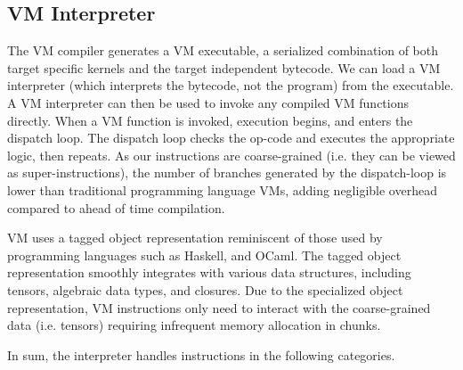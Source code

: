 \subsection{VM Interpreter}



The VM compiler generates a VM executable,
  a serialized combination of both target specific kernels
  and the target independent bytecode.
We can load a VM interpreter (which interprets the bytecode, not the program) from the executable.
A VM interpreter can then be used to invoke any compiled VM
  functions directly.
When a VM function is invoked,
  execution begins, and enters the dispatch loop.
The dispatch loop checks the op-code and executes
  the appropriate logic, then repeats.
As our instructions are coarse-grained (i.e. they can be viewed as super-instructions),
  the number of branches generated by the dispatch-loop is lower
  than traditional programming language VMs,
  adding negligible overhead compared to ahead of time compilation.

VM uses a tagged object representation reminiscent of those
  used by programming languages such as Haskell, and OCaml.
The tagged object representation smoothly integrates
  with various data structures, including tensors,
  algebraic data types, and closures.
Due to the specialized object representation,
  VM instructions only need to interact with the
  coarse-grained data (i.e. tensors)
  requiring infrequent memory allocation in chunks.

In sum, the interpreter handles instructions in the following categories.

